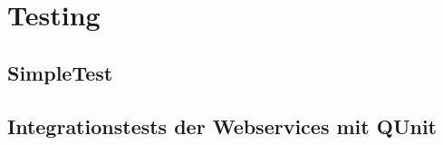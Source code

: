 \section{Testing}

\subsection{SimpleTest}

\subsection{Integrationstests der Webservices mit QUnit}
